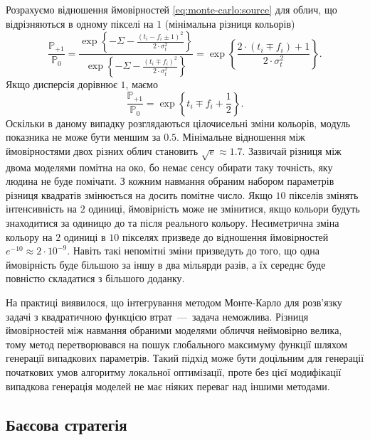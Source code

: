 Розрахуємо відношення ймовірностей \eqref{eq:monte-carlo:source} для облич,
що відрізняються в одному пікселі на $1$ (мінімальна різниця кольорів)
\begin{equation*}
  \frac{\mathbb{P}_{+1}}{\mathbb{P}_{0}}
  = \frac
    {\exp\left\{- \Sigma - \frac{\left( t_i - f_i \pm 1 \right)^2}{2 \cdot \sigma_t^2}\right\}}
    {\exp\left\{- \Sigma - \frac{\left( t_i \mp f_i \right)^2}{2 \cdot \sigma_t^2}\right\}}
  = \exp{\left\{ \frac{2 \cdot \left( t_i \mp f_i \right) + 1}{2 \cdot \sigma_t^2} \right\}}.
\end{equation*}
Якщо дисперсія дорівнює $1$, маємо
\begin{equation*}
  \frac{\mathbb{P}_{+1}}{\mathbb{P}_{0}}
  = \exp{\left\{ t_i \mp f_i + \frac{1}{2} \right\}}.
\end{equation*}
Оскільки в даному випадку розглядаються цілочисельні зміни кольорів,
модуль показника не може бути меншим за $0.5$.
Мінімальне відношення між ймовірностями двох різних облич
становить $\sqrt{e} \approx 1.7$.
Зазвичай різниця між двома моделями помітна на око,
бо немає сенсу обирати таку точність, яку людина не буде помічати.
З кожним навмання обраним набором параметрів
різниця квадратів змінюється на досить помітне число.
Якщо $10$ пікселів змінять інтенсивність на $2$ одиниці,
ймовірність може не змінитися,
якщо кольори будуть знаходитися за одиницю до та після реального кольору.
Несиметрична зміна кольору на $2$ одиниці в $10$ пікселях призведе
до відношення ймовірностей $e^{-10} \approx 2 \cdot 10^{-9}$.
Навіть такі непомітні зміни призведуть до того,
що одна ймовірність буде більшою за іншу в два мільярди разів,
а їх середнє буде повністю складатися з більшого доданку.

На практиці виявилося,
що інтегрування методом Монте-Карло
для розв'язку задачі з квадратичною функцією втрат~---~задача неможлива.
Різниця ймовірностей між навмання обраними моделями обличчя неймовірно велика,
тому метод перетворювався на пошук глобального максимуму функції
шляхом генерації випадкових параметрів.
Такий підхід може бути доцільним
для генерації початкових умов алгоритму локальної оптимізації,
проте без цієї модифікації випадкова генерація моделей
не має ніяких переваг над іншими методами.

\subsection{Баєсова стратегія}

